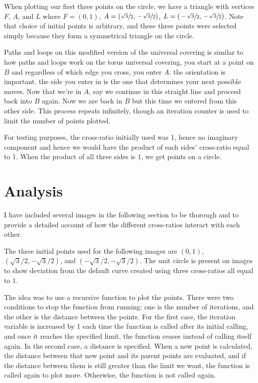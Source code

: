 \documentclass[12pt,a4paper,reqno,parskip=full]{amsart}
\numberwithin{equation}{section}
\theoremstyle{plain}
\theoremstyle{definition}
\begin{document}
When plotting our first three points on the circle, we have a triangle with vertices $F$, $A$, and $L$ where
{$F=(0,1)$, $A=\left(\sfrac{\sqrt3}{2},\sfrac{-\sqrt3}{2}\right)$, $L=\left(\sfrac{-\sqrt3}{2},\sfrac{-\sqrt3}{2}\right)$}. Note that choice of initial points is arbitrary, and these three points were selected simply because they form a symmetrical triangle on the circle.

Paths and loops on this modified version of the universal covering is similar to how paths and loops work on the torus universal covering, you start at a point on $B$ and regardless of which edge you cross, you enter $A$. the orientation is important. the side you enter in is the one that determines your next possible moves. Now that we're in $A$, say we continue in this straight line and proceed back into $B$ again. Now we are back in $B$ but this time we entered from this other side. This process repeats infinitely, though an iteration counter is used to limit the number of points plotted.

For testing purposes, the cross-ratio initially used was 1, hence no imaginary component and hence we would have the product of each sides' cross-ratio equal to 1. When the product of all three sides is $1$, we get points on a circle.

\section{Analysis}

I have included several images in the following section to be thorough and to provide a detailed account of how the different cross-ratios interact with each other. 

The three initial points used for the following images are 
$(0,1)$, $\left({\sqrt{3}}/{2},{-\sqrt{3}}/{2}\right)$, and $\left({-\sqrt{3}}/{2},{-\sqrt{3}}/{2}\right)$.
The unit circle is present on images to show deviation from the default curve created using three cross-ratios all equal to $1$.

The idea was to use a recursive function to plot the points. There were two conditions to stop the function from running: one is the number of iterations, and the other is the distance between the points. For the first case, the iteration variable is increased by 1 each time the function is called after its initial calling, and once it reaches the specified limit, the function ceases instead of calling itself again. In the second case, a distance is specified. When a new point is calculated, the distance between that new point and its parent points are evaluated, and if the distance between them is still greater than the limit we want, the function is called again to plot more. Otherwise, the function is not called again.
\end{document}
